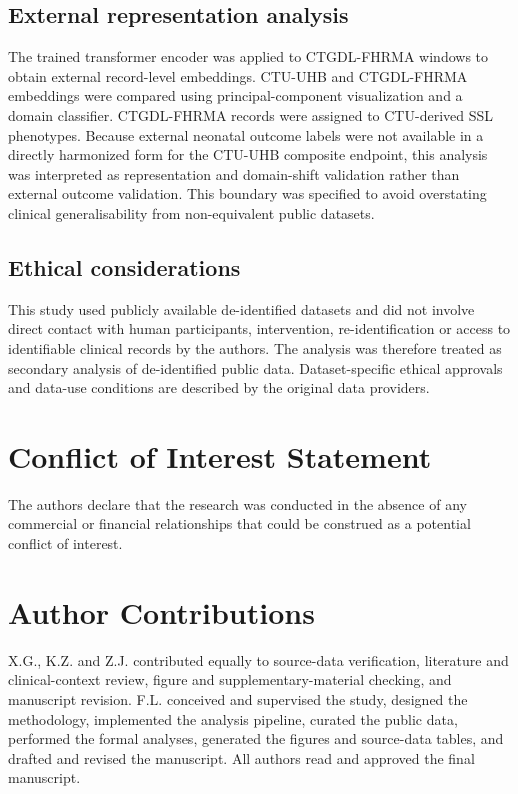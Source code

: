 \documentclass[utf8]{FrontiersinHarvard}
\begin{document}
\subsection{External representation analysis}

The trained transformer encoder was applied to CTGDL-FHRMA windows to obtain external record-level embeddings. CTU-UHB and CTGDL-FHRMA embeddings were compared using principal-component visualization and a domain classifier. CTGDL-FHRMA records were assigned to CTU-derived SSL phenotypes. Because external neonatal outcome labels were not available in a directly harmonized form for the CTU-UHB composite endpoint, this analysis was interpreted as representation and domain-shift validation rather than external outcome validation. This boundary was specified to avoid overstating clinical generalisability from non-equivalent public datasets.

\subsection{Ethical considerations}

This study used publicly available de-identified datasets and did not involve direct contact with human participants, intervention, re-identification or access to identifiable clinical records by the authors. The analysis was therefore treated as secondary analysis of de-identified public data. Dataset-specific ethical approvals and data-use conditions are described by the original data providers.

        \section*{Conflict of Interest Statement}
        The authors declare that the research was conducted in the absence of any commercial or financial relationships that could be construed as a potential conflict of interest.

        \section*{Author Contributions}
        X.G., K.Z. and Z.J. contributed equally to source-data verification, literature and clinical-context review, figure and supplementary-material checking, and manuscript revision. F.L. conceived and supervised the study, designed the methodology, implemented the analysis pipeline, curated the public data, performed the formal analyses, generated the figures and source-data tables, and drafted and revised the manuscript. All authors read and approved the final manuscript.
\end{document}
